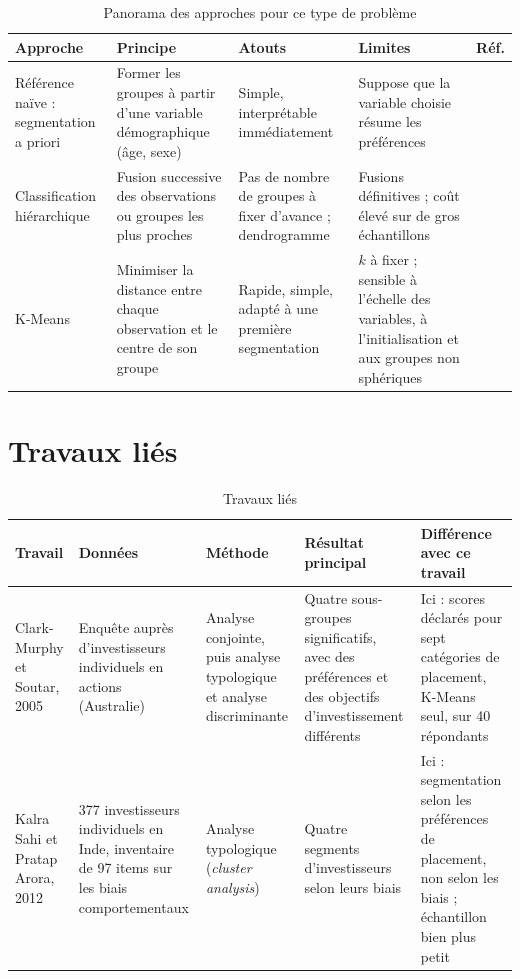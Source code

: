 \documentclass[11pt,a4paper]{article}
\begin{document}
\begin{table}[htbp]
  \centering
  \caption{Panorama des approches pour ce type de problème}
  \label{tab:etat}
  \small
  \begin{tabular}{@{}P{3cm} P{4.3cm} P{3.5cm} P{3.5cm} l@{}}
    \toprule
    Approche & Principe & Atouts & Limites & Réf. \\
    \midrule
    Référence naïve : segmentation a priori & Former les groupes à partir d'une variable démographique (âge, sexe) & Simple, interprétable immédiatement & Suppose que la variable choisie résume les préférences & \cite{etat1} \\
    Classification hiérarchique & Fusion successive des observations ou groupes les plus proches & Pas de nombre de groupes à fixer d'avance ; dendrogramme & Fusions définitives ; coût élevé sur de gros échantillons & \cite{ward1963} \\
    K-Means & Minimiser la distance entre chaque observation et le centre de son groupe & Rapide, simple, adapté à une première segmentation & $k$ à fixer ; sensible à l'échelle des variables, à l'initialisation et aux groupes non sphériques & \cite{macqueen1967,jain2010,arthur2007} \\
    \bottomrule
  \end{tabular}
\end{table}

\section{Travaux liés}
\label{sec:travaux}
\begin{table}[htbp]
  \centering
  \caption{Travaux liés}
  \label{tab:travaux}
  \small
  \begin{tabular}{@{}P{2.4cm} P{2.8cm} P{2.8cm} P{3.4cm} P{3.8cm}@{}}
    \toprule
    Travail & Données & Méthode & Résultat principal & Différence avec ce travail \\
    \midrule
    Clark-Murphy et Soutar, 2005 \cite{lie1} & Enquête auprès d'investisseurs individuels en actions (Australie) & Analyse conjointe, puis analyse typologique et analyse discriminante & Quatre sous-groupes significatifs, avec des préférences et des objectifs d'investissement différents & Ici : scores déclarés pour sept catégories de placement, K-Means seul, sur 40 répondants \\
    Kalra Sahi et Pratap Arora, 2012 \cite{lie2} & 377 investisseurs individuels en Inde, inventaire de 97 items sur les biais comportementaux & Analyse typologique (\emph{cluster analysis}) & Quatre segments d'investisseurs selon leurs biais & Ici : segmentation selon les préférences de placement, non selon les biais ; échantillon bien plus petit \\
    \bottomrule
  \end{tabular}
\end{table}
\end{document}
